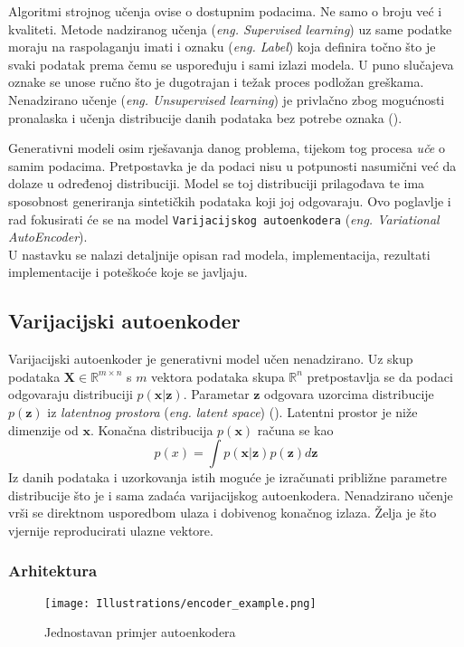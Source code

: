 Algoritmi strojnog učenja ovise o dostupnim podacima.
Ne samo o broju već i kvaliteti.
Metode nadziranog učenja (\emph{eng. Supervised learning}) uz same podatke moraju na raspolaganju imati i oznaku (\emph{eng. Label}) koja definira točno što je svaki podatak prema čemu se uspoređuju i sami izlazi modela.
U puno slučajeva oznake se unose ručno što je dugotrajan i težak proces podložan greškama.
Nenadzirano učenje (\emph{eng. Unsupervised learning}) je privlačno zbog mogućnosti pronalaska i učenja distribucije danih podataka bez potrebe oznaka (\cite{ev_var_ae}).

Generativni modeli osim rješavanja danog problema, tijekom tog procesa \emph{uče} o samim podacima.
Pretpostavka je da podaci nisu u potpunosti nasumični već da dolaze u određenoj distribuciji.
Model se toj distribuciji prilagođava te ima sposobnost generiranja sintetičkih podataka koji joj odgovaraju.
Ovo poglavlje i rad fokusirati će se na model \texttt{Varijacijskog autoenkodera} (\emph{eng. Variational AutoEncoder}). \\
U nastavku se nalazi detaljnije opisan rad modela, implementacija, rezultati implementacije i poteškoće koje se javljaju.

\subsection{Varijacijski autoenkoder}
Varijacijski autoenkoder je generativni model učen nenadzirano.
Uz skup podataka $\boldsymbol{X} \in \mathbb{R}^{m \times n}$ s $m$ vektora podataka skupa $\mathbb{R}^{n}$ pretpostavlja se da podaci odgovaraju distribuciji $p(\boldsymbol{x}|\boldsymbol{z})$.
Parametar $\boldsymbol{z}$ odgovara uzorcima distribucije $p(\boldsymbol{z})$ iz \emph{latentnog prostora} (\emph{eng. latent space}) (\cite{ev_var_ae}).
Latentni prostor je niže dimenzije od $\boldsymbol{x}$.
Konačna distribucija $p(\boldsymbol{x})$ računa se kao
$$p(x) = \int p(\boldsymbol{x} | \boldsymbol{z})p(\boldsymbol{z})d\boldsymbol{z}$$
Iz danih podataka i uzorkovanja istih moguće je izračunati približne parametre distribucije što je i sama zadaća varijacijskog autoenkodera.
Nenadzirano učenje vrši se direktnom usporedbom ulaza i dobivenog konačnog izlaza.
Želja je što vjernije reproducirati ulazne vektore.

\subsubsection{Arhitektura}

\begin{figure}[H]
	\centering
	\texttt{[image: Illustrations/encoder\_example.png]}
	\caption{Jednostavan primjer autoenkodera}
	\label{fig:autoencoder_example}
\end{figure}

